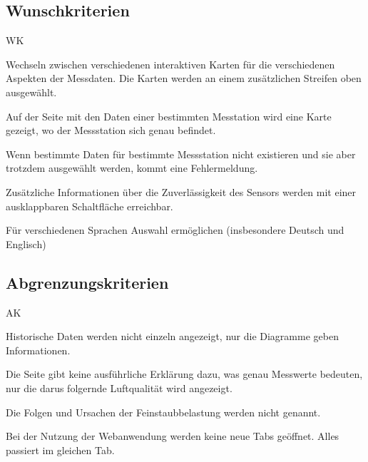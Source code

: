 \newpage
\subsection{Wunschkriterien}
\begin{Kriterien}{WK}

	\item Wechseln zwischen verschiedenen interaktiven Karten für die verschiedenen Aspekten der Messdaten. Die Karten werden an einem zusätzlichen Streifen oben ausgewählt.

	\item Auf der Seite mit den Daten einer bestimmten Messtation wird eine Karte gezeigt, wo der Messstation sich genau befindet. 

	\item Wenn bestimmte Daten für bestimmte Messstation nicht existieren und sie aber trotzdem ausgewählt werden, kommt eine Fehlermeldung.

	\item Zusätzliche Informationen über die Zuverlässigkeit des Sensors werden mit einer ausklappbaren Schaltfläche erreichbar.

	\item Für verschiedenen Sprachen Auswahl ermöglichen (insbesondere Deutsch und Englisch)

\end{Kriterien}

\subsection{Abgrenzungskriterien}
\begin{Kriterien}{AK}

	\item Historische Daten werden nicht einzeln angezeigt, nur die Diagramme geben Informationen.
	
	\item Die Seite gibt keine ausführliche Erklärung dazu, was  genau Messwerte bedeuten, nur die darus folgernde Luftqualität wird angezeigt. 
	
	\item Die Folgen und Ursachen der Feinstaubbelastung werden nicht genannt.
	
	\item Bei der Nutzung der Webanwendung werden keine neue Tabs geöffnet. Alles passiert im gleichen Tab.
	
\end{Kriterien}
